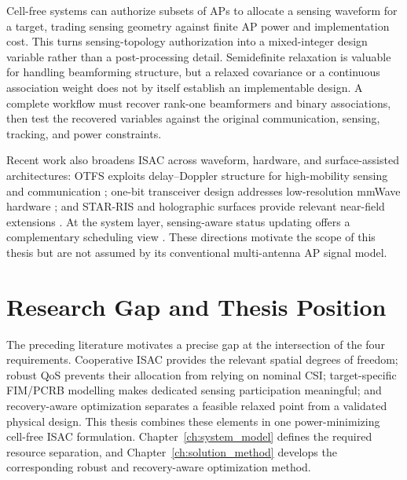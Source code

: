 Cell-free systems can authorize subsets of APs to allocate a sensing waveform
for a target, trading sensing geometry against finite AP power and implementation
cost. This turns sensing-topology authorization into a mixed-integer design variable rather
than a post-processing detail. Semidefinite relaxation is valuable for handling
beamforming structure, but a relaxed covariance or a continuous association
weight does not by itself establish an implementable design. A complete
workflow must recover rank-one beamformers and binary associations, then test
the recovered variables against the original communication, sensing, tracking,
and power constraints.

Recent work also broadens ISAC across waveform, hardware, and surface-assisted
architectures: OTFS exploits delay--Doppler structure for high-mobility sensing
and communication \autocite{yuanOTFSISAC2021}; one-bit transceiver design
addresses low-resolution mmWave hardware \autocite{linOneBitISAC2025}; and
STAR-RIS and holographic surfaces provide relevant near-field extensions
\autocite{wangSTARRISNearfield2025,zhangHolographicISAC2022}. At the system
layer, sensing-aware status updating offers a complementary scheduling view
\autocite{pengSensingCommunicationStatus2023}. These directions motivate the
scope of this thesis but are not assumed by its conventional multi-antenna AP
signal model.

\section{Research Gap and Thesis Position}

The preceding literature motivates a precise gap at the intersection of the
four requirements. Cooperative ISAC provides the relevant spatial degrees of
freedom; robust QoS prevents their allocation from relying on nominal CSI;
target-specific FIM/PCRB modelling makes dedicated sensing participation
meaningful; and recovery-aware optimization separates a feasible relaxed point
from a validated physical design. This thesis combines these elements in one
power-minimizing cell-free ISAC formulation. Chapter~\ref{ch:system_model}
defines the required resource separation, and Chapter~\ref{ch:solution_method}
develops the corresponding robust and recovery-aware optimization method.
